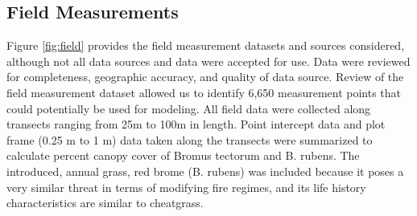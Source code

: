 \def\year{2017}\relax \documentclass[letterpaper]{article}
\begin{document}
\subsection{Field Measurements}
 Figure \ref{fig:field}  provides the field measurement datasets and sources considered, although not all data sources and data were accepted for use. Data were reviewed for completeness, geographic accuracy, and quality of data source. Review of the field measurement dataset allowed us to identify 6,650 measurement points that could potentially be used for modeling. All field data were collected along transects ranging from 25m to 100m in length. Point intercept data and plot frame (0.25 m to 1 m) data taken along the transects were summarized to calculate percent canopy cover of Bromus tectorum and B. rubens.  The introduced, annual grass, red brome (B. rubens) was included because it poses a very similar threat in terms of modifying fire regimes, and its life history characteristics are similar to cheatgrass.
\end{document}
